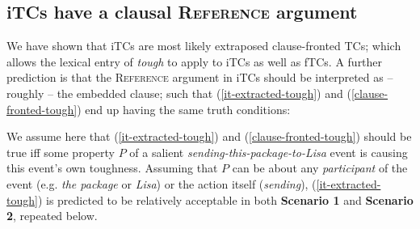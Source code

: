 \documentclass[11pt]{article}
\begin{document}
\subsection{iTCs have a clausal \textsc{Reference} argument}
	 We have shown that iTCs are most likely extraposed clause-fronted TCs; which allows the lexical entry of \textit{tough} to apply to iTCs as well as fTCs.
	 A further prediction is that the \textsc{Reference} argument in iTCs should be interpreted as -- roughly -- the embedded clause; such that  (\ref{it-extracted-tough}) and (\ref{clause-fronted-tough}) end up having the same truth conditions:
	\begin{exe}
		\ex 
		\begin{xlist}
			\label{it-extracted-tough}
			\label{clause-fronted-tough}
		\end{xlist}
	\end{exe}
	 We assume here that (\ref{it-extracted-tough}) and (\ref{clause-fronted-tough}) should be true iff some property $P$ of a salient \textit{sending-this-package-to-Lisa} event is causing this event's own toughness. Assuming that $P$ can be about any \textit{participant} of the event (e.g. \textit{the package} or \textit{Lisa}) or the action itself (\textit{sending}), (\ref{it-extracted-tough}) is predicted to be relatively acceptable in both \textbf{Scenario 1} and \textbf{Scenario 2}, repeated below.
	 \begin{center}
	 \end{center}
	 \begin{center}
	 \end{center}
 	
\end{document}
